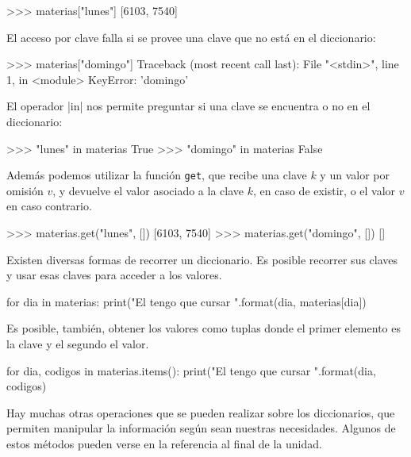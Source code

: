 \begin{codigo-python-sn}
>>> materias["lunes"]
[6103, 7540]
\end{codigo-python-sn}

\begin{atencion}
El acceso por clave falla si se provee una clave que no está en el diccionario:

\begin{codigo-python-sn}
>>> materias["domingo"]
Traceback (most recent call last):
  File "<stdin>", line 1, in <module>
KeyError: 'domingo'
\end{codigo-python-sn}
\end{atencion}

El operador |in| nos permite preguntar si una clave se encuentra o no en el
diccionario:

\begin{codigo-python-sn}
>>> "lunes" in materias
True
>>> "domingo" in materias
False
\end{codigo-python-sn}

Además podemos utilizar la función \lstinline{get}, que recibe una
clave $k$ y un valor por omisión $v$, y devuelve el valor asociado a la clave
$k$, en caso de existir, o el valor $v$ en caso contrario.

\begin{codigo-python-sn}
>>> materias.get("lunes", [])
[6103, 7540]
>>> materias.get("domingo", [])
[]
\end{codigo-python-sn}

Existen diversas formas de recorrer un diccionario.  Es posible recorrer
sus claves y usar esas claves para acceder a los valores.

\begin{codigo-python-sn}
for dia in materias:
    print("El {} tengo que cursar {}".format(dia, materias[dia])
\end{codigo-python-sn}

Es posible, también, obtener los valores como tuplas donde el primer
elemento es la clave y el segundo el valor.

\begin{codigo-python-sn}
for dia, codigos in materias.items():
    print("El {} tengo que cursar {}".format(dia, codigos)
\end{codigo-python-sn}

Hay muchas otras operaciones que se
pueden realizar sobre los diccionarios, que permiten manipular la información
según sean nuestras necesidades. Algunos de estos métodos pueden verse en
la referencia al final de la unidad.

